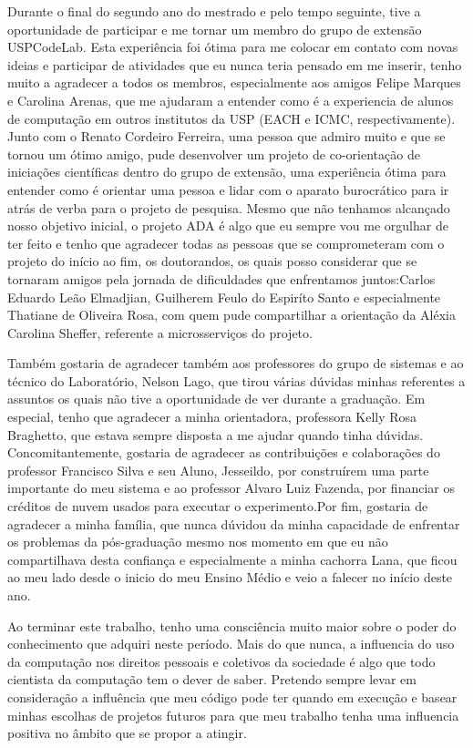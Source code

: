 \documentclass[11pt,twoside,a4paper]{book}
\begin{document}
 Durante o final do segundo ano do mestrado e pelo tempo seguinte, tive a oportunidade de participar e me tornar um membro do grupo de extensão USPCodeLab. Esta experiência foi ótima para me colocar em contato com novas ideias e participar de atividades que eu nunca teria pensado em me inserir, tenho muito a agradecer a todos os membros, especialmente aos amigos  Felipe Marques e Carolina Arenas, que me ajudaram a entender como é a experiencia de alunos de computação em outros institutos da USP (EACH e ICMC, respectivamente). Junto com o Renato Cordeiro Ferreira, uma pessoa que admiro muito e que se tornou um ótimo amigo, pude desenvolver um projeto de co-orientação de iniciações científicas dentro do grupo de extensão, uma experiência ótima para entender como é orientar uma pessoa e lidar com o aparato burocrático para ir atrás de verba para o projeto de pesquisa. Mesmo que não tenhamos alcançado nosso objetivo inicial, o projeto ADA é algo que eu sempre vou me orgulhar de ter feito e tenho que agradecer todas as pessoas que se comprometeram com o projeto do início ao fim, os doutorandos, os quais posso considerar que se tornaram amigos pela jornada de dificuldades que enfrentamos juntos:Carlos Eduardo Leão Elmadjian, Guilherem Feulo do Espiríto Santo e especialmente Thatiane de Oliveira Rosa, com quem pude compartilhar a orientação da Aléxia Carolina Sheffer, referente a microsserviços do projeto.
 
 Também gostaria de agradecer também aos professores do grupo de sistemas e ao técnico do Laboratório, Nelson Lago, que tirou várias dúvidas minhas referentes a assuntos os quais não tive a oportunidade de ver durante a graduação. Em especial, tenho que agradecer a minha orientadora, professora Kelly Rosa Braghetto, que estava sempre disposta a me ajudar quando tinha dúvidas. Concomitantemente, gostaria de agradecer as contribuições e colaborações do professor Francisco Silva e seu Aluno, Jesseildo, por construírem uma parte importante do meu sistema e ao professor Alvaro Luiz Fazenda, por financiar os créditos de nuvem usados para executar o experimento.Por fim, gostaria de agradecer a minha família, que nunca dúvidou da minha capacidade de enfrentar os problemas da pós-graduação mesmo nos momento em que eu não compartilhava desta confiança e especialmente a minha cachorra Lana, que ficou ao meu lado desde o inicio do meu Ensino Médio e veio a falecer no início deste ano. 
 
 Ao terminar este trabalho, tenho uma consciência muito maior sobre o poder do conhecimento que adquiri neste período. Mais do que nunca, a influencia do uso da computação nos direitos pessoais e coletivos da sociedade é algo que todo cientista da computação tem o dever de saber. Pretendo sempre levar em consideração a influência que meu código pode ter quando em execução e basear minhas escolhas de projetos futuros para que meu trabalho tenha uma influencia positiva no âmbito que se propor a atingir.
 
\end{document}

